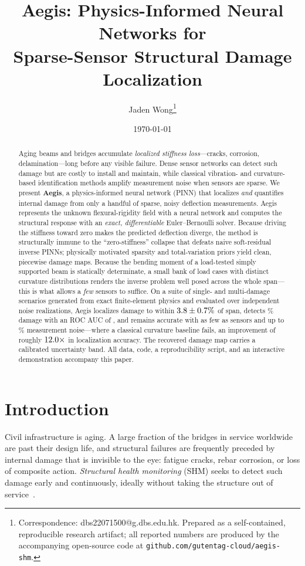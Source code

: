 \documentclass[11pt]{article}
\title{\textbf{Aegis: Physics-Informed Neural Networks for\\
Sparse-Sensor Structural Damage Localization}}
\author[1]{Jaden Wong\thanks{Correspondence: dbs22071500@g.dbs.edu.hk. Prepared as
a self-contained, reproducible research artifact; all reported numbers are
produced by the accompanying open-source code at
\texttt{github.com/gutentag-cloud/aegis-shm}.}}
\affil[1]{Diocesan Boys' School, Hong Kong}
\date{\today}
\begin{document}
\maketitle

\begin{abstract}
\noindent
Aging beams and bridges accumulate \emph{localized stiffness loss}---cracks,
corrosion, delamination---long before any visible failure. Dense sensor networks
can detect such damage but are costly to install and maintain, while classical
vibration- and curvature-based identification methods amplify measurement noise
when sensors are sparse. We present \textbf{Aegis}, a physics-informed neural
network (PINN) that localizes \emph{and} quantifies internal damage from only a
handful of sparse, noisy deflection measurements. Aegis represents the unknown
flexural-rigidity field with a neural network and computes the structural response
with an \emph{exact, differentiable} Euler--Bernoulli solver. Because driving the
stiffness toward zero makes the predicted deflection diverge, the method is
structurally immune to the ``zero-stiffness'' collapse that defeats naive
soft-residual inverse PINNs; physically motivated sparsity and total-variation
priors yield clean, piecewise damage maps. Because the bending
moment of a load-tested simply supported beam is statically determinate, a small
bank of load cases with distinct curvature distributions renders the inverse
problem well posed across the whole span---this is what allows a \emph{few}
sensors to suffice. On a suite of \ngallery{} single- and multi-damage scenarios
generated from exact finite-element physics and evaluated over \nseeds{}
independent noise realizations, Aegis localizes damage to within
$3.8\pm0.7\%$ of span, detects \sevbig\% damage with an ROC AUC of
\aucbig, and remains accurate with as few as \minsensors{} sensors and up to
\worstnoise\% measurement noise---where a classical curvature baseline fails, an
improvement of roughly $12.0\times$ in localization accuracy. The
recovered damage map carries a calibrated uncertainty band. All data, code, a
reproducibility script, and an interactive demonstration accompany this paper.
\end{abstract}

\section{Introduction}
Civil infrastructure is aging. A large fraction of the bridges in service
worldwide are past their design life, and structural failures are frequently
preceded by internal damage that is invisible to the eye: fatigue cracks, rebar
corrosion, or loss of composite action. \emph{Structural health monitoring}
(SHM) seeks to detect such damage early and continuously, ideally without taking
the structure out of service~\cite{farrar2007introduction,worden2007fundamental}.
\end{document}
